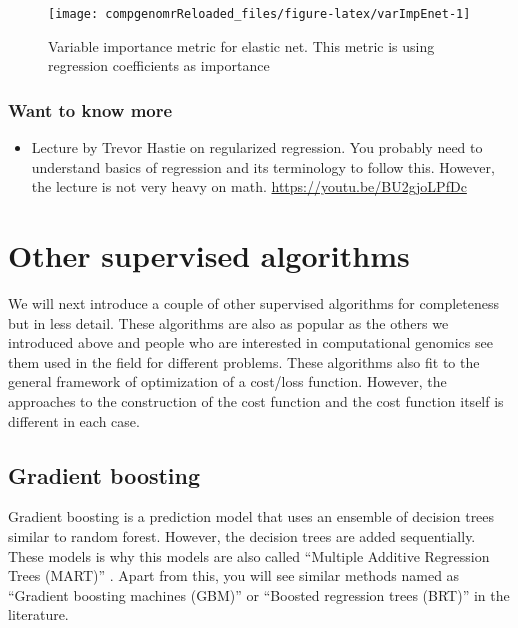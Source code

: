 \documentclass[12pt,]{krantz}
\providecommand{\tightlist}{%
  \setlength{\itemsep}{0pt}\setlength{\parskip}{0pt}}
\begin{document}
\begin{figure}

{\centering \texttt{[image: compgenomrReloaded\_files/figure-latex/varImpEnet-1]} 

}

\caption{Variable importance metric for elastic net. This metric is using regression coefficients as importance}\label{fig:varImpEnet}
\end{figure}

\hypertarget{want-to-know-more}{%
\subsubsection{Want to know more}\label{want-to-know-more}}

\begin{itemize}
\tightlist
\item
  Lecture by Trevor Hastie on regularized regression. You probably need to understand basics of regression and its terminology to follow this. However, the lecture is not very heavy on math. \url{https://youtu.be/BU2gjoLPfDc}
\end{itemize}

\hypertarget{other-supervised-algorithms}{%
\section{Other supervised algorithms}\label{other-supervised-algorithms}}

We will next introduce a couple of other supervised algorithms for completeness but in less detail. These algorithms are also as popular as the others we introduced above and people who are interested in computational genomics see them used in the field for different problems. These algorithms also fit to the general framework of optimization of a cost/loss function. However, the approaches to the construction of the cost function and the cost function itself is different in each case.

\hypertarget{gradient-boosting}{%
\subsection{Gradient boosting}\label{gradient-boosting}}

Gradient boosting is a prediction model that uses an ensemble of decision trees similar to random forest. However, the decision trees are added sequentially. These models is why this models are also called ``Multiple Additive Regression Trees (MART)'' \citep{friedman2003mart}. Apart from this, you will see similar methods named as ``Gradient boosting machines (GBM)''\citep{friedman2001gbm} or ``Boosted regression trees (BRT)'' \citep{elith2008brt} in the literature.
\end{document}
